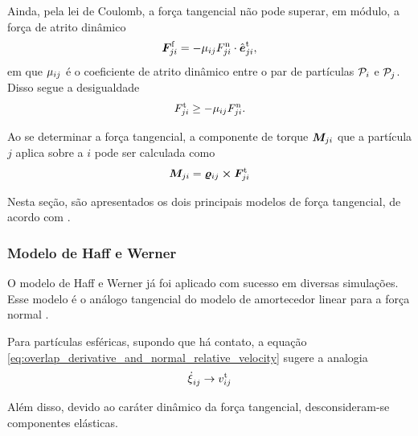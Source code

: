 Ainda, pela lei de Coulomb, a força tangencial não pode superar, em módulo, a força de atrito dinâmico 
\begin{equation*}
	{\bm{F}}_{j i}^{\text{f}} = - {\mu}_{i j}{F}_{j i}^{\text{n}}\cdot{\hat{\bm{e}}}_{j i}^{\text{t}},
\end{equation*}
em que \({\mu}_{i j}\) é o coeficiente de atrito dinâmico entre o par de partículas \({\mathcal{P}}_{i}\) e \({\mathcal{P}}_{j}\). Disso segue a desigualdade
\begin{equation} \label{eq:coulomb_law}
	{F}_{j i}^{\text{t}} \geq - {\mu}_{i j}{F}_{j i}^{\text{n}}.
\end{equation}

Ao se determinar a força tangencial, a componente de torque \({\bm{M}}_{j i}\) que a partícula \(j\) aplica sobre a \(i\) pode ser calculada como
\begin{equation*}
	{\bm{M}}_{j i} = {\bm{\varrho}}_{i j}\cross{\bm{F}}_{j i}^{\text{t}}
\end{equation*}

Nesta seção, são apresentados os dois principais modelos de força tangencial, de acordo com .

\subsubsection*{Modelo de Haff e Werner}

O modelo de Haff e Werner já foi aplicado com sucesso em diversas simulações. Esse modelo é o análogo tangencial do modelo de amortecedor linear para a força normal \cite{bib:computational_granular_dynamics}.

Para partículas esféricas, supondo que há contato, a equação \eqref{eq:overlap_derivative_and_normal_relative_velocity} sugere a analogia
\begin{equation*}
	\overlapDerivativeij \to \relativeTangentialVelocityScalarij
\end{equation*}

Além disso, devido ao caráter dinâmico da força tangencial, desconsideram-se componentes elásticas.

